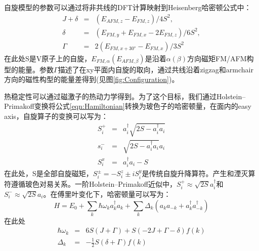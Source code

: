 \documentclass[reprint, aps, prb, showkeys]{revtex4-2}
\begin{document}
自旋模型的参数可以通过将非共线的DFT计算映射到Heisenberg哈密顿公式中：
\begin{eqnarray}
    J + \delta &=& (E_{AFM,z} - E_{FM, z}) / 4S^2, \\
    \delta &=& (E_{FM, y} + E_{FM, x} - 2E_{FM,z})/ 6S^2, \\
    \Gamma &=& 2(E_{FM, x + 30°} - E_{FM, x}) / 3S^2
\end{eqnarray}
在此处S是V原子上的自旋，$E_{FM, \alpha}(E_{AFM, \beta})$是沿着$\alpha(\beta)$方向磁矩FM/AFM构型的能量。参数$\Gamma$描述了在xy平面内自旋的取向，通过共线沿着zigzag和armchair方向的磁性构型的能量差得到(见图\ref{fig:Configuration})。

热稳定性可以通过磁激子的热动力学得到。为了这个目标，我们通过Holstein–Primakoff变换将公式\ref{eqn:Hamiltonian}转换为玻色子的哈密顿量，在面内的easy axis，自旋算子的变换可以写为：
\begin{eqnarray}
    S_i^{+} &=& a_i^{\dagger} \sqrt{2S - a_i^{\dagger} a_i} \\
    s_i^{-} &=& \sqrt{2S - a_i^{\dagger} a_i} a_i \\
    S_i^{x} &=& a_i^{\dagger} a_i - S
\end{eqnarray}
在此处，S是全部自旋磁矩，$S_i^{\pm} = - S_i^z \pm iS_i^y$是传统自旋升降算符。产生和湮灭算符遵循玻色对易关系。一阶Holstein–Primakoff近似中，$S_i^{+} \approx \sqrt{2S} a_i^{\dagger}$和$S_i^{-} \approx \sqrt{2S} a_i$。在傅里叶变化下，哈密顿量可以写为：
\begin{equation}
    H = E_0 + \sum_k \hbar \omega_k a_k^{\dagger} a_k + \sum_k \Delta_k \left( a_k a_{-k} + a_k^{\dagger}a_{-k}^{\dagger} \right)
\end{equation}
在此处
\begin{eqnarray}
    \hbar \omega_k &=& 6S(J + \Gamma) + S(-2J + \Gamma - \delta)f(k) \\
    \Delta_k &=& -\frac{1}{2} S(\delta + \Gamma) f(k)
\end{eqnarray}
\end{document}
